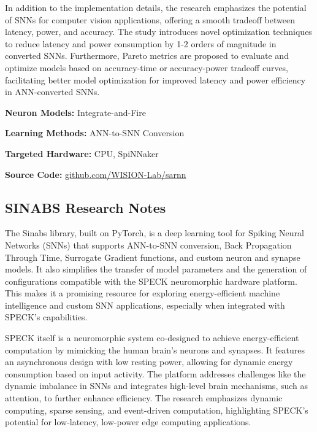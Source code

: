 In addition to the implementation details, the research emphasizes the potential of SNNs for computer vision applications, offering a smooth tradeoff between latency, power, and accuracy. The study introduces novel optimization techniques to reduce latency and power consumption by 1-2 orders of magnitude in converted SNNs. Furthermore, Pareto metrics are proposed to evaluate and optimize models based on accuracy-time or accuracy-power tradeoff curves, facilitating better model optimization for improved latency and power efficiency in ANN-converted SNNs.

\begin{tcolorbox}[enhanced,attach boxed title to top center={yshift=-3mm,yshifttext=-1mm}, colback=blue!5!white,colframe=blue!75!black,colbacktitle=red!80!black, title=SaRNN at a Glance,fonttitle=\bfseries, boxed title style={size=small,colframe=red!50!black} ]

\textbf{Neuron Models:} Integrate-and-Fire

\textbf{Learning Methods:} ANN-to-SNN Conversion  

\textbf{Targeted Hardware:} CPU, SpiNNaker 

\textbf{Source Code:} \href{https://github.com/WISION-Lab/sarnn}{github.com/WISION-Lab/sarnn}
\end{tcolorbox}
\subsection*{SINABS Research Notes}\label{SINABS}

The Sinabs library, built on PyTorch, is a deep learning tool for Spiking Neural Networks (SNNs) that supports ANN-to-SNN conversion, Back Propagation Through Time, Surrogate Gradient functions, and custom neuron and synapse models. It also simplifies the transfer of model parameters and the generation of configurations compatible with the SPECK neuromorphic hardware platform. This makes it a promising resource for exploring energy-efficient machine intelligence and custom SNN applications, especially when integrated with SPECK’s capabilities.

SPECK itself is a neuromorphic system co-designed to achieve energy-efficient computation by mimicking the human brain's neurons and synapses. It features an asynchronous design with low resting power, allowing for dynamic energy consumption based on input activity. The platform addresses challenges like the dynamic imbalance in SNNs and integrates high-level brain mechanisms, such as attention, to further enhance efficiency. The research emphasizes dynamic computing, sparse sensing, and event-driven computation, highlighting SPECK’s potential for low-latency, low-power edge computing applications.

